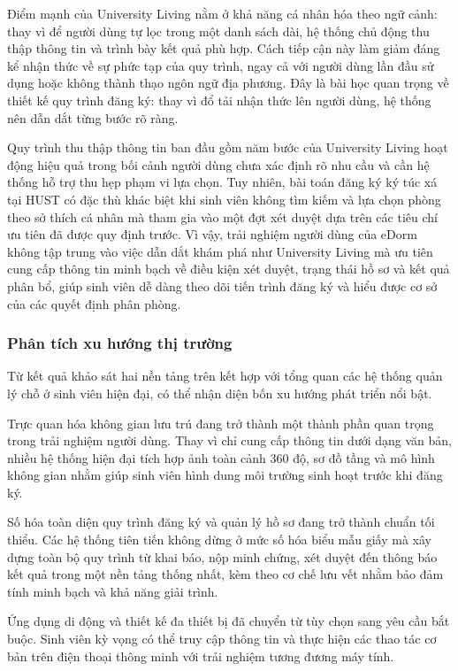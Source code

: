\documentclass[../DoAn.tex]{subfiles}
\begin{document}
Điểm mạnh của University Living nằm ở khả năng cá nhân hóa theo ngữ cảnh: thay
vì để người dùng tự lọc trong một danh sách dài, hệ thống chủ động thu thập
thông tin và trình bày kết quả phù hợp. Cách tiếp cận này làm giảm đáng kể
nhận thức về sự phức tạp của quy trình, ngay cả với người dùng lần đầu sử dụng
hoặc không thành thạo ngôn ngữ địa phương. Đây là bài học quan trọng về thiết
kế quy trình đăng ký: thay vì đổ tải nhận thức lên người dùng, hệ thống nên
dẫn dắt từng bước rõ ràng.

Quy trình thu thập thông tin ban đầu gồm năm bước của University Living hoạt
động hiệu quả trong bối cảnh người dùng chưa xác định rõ nhu cầu và cần hệ
thống hỗ trợ thu hẹp phạm vi lựa chọn. Tuy nhiên, bài toán đăng ký ký túc xá
tại HUST có đặc thù khác biệt khi sinh viên không tìm kiếm và lựa chọn phòng
theo sở thích cá nhân mà tham gia vào một đợt xét duyệt dựa trên các tiêu chí
ưu tiên đã được quy định trước. Vì vậy, trải nghiệm người dùng của eDorm không
tập trung vào việc dẫn dắt khám phá như University Living mà ưu tiên cung cấp
thông tin minh bạch về điều kiện xét duyệt, trạng thái hồ sơ và kết quả phân
bổ, giúp sinh viên dễ dàng theo dõi tiến trình đăng ký và hiểu được cơ sở của
các quyết định phân phòng.

\subsubsection*{Phân tích xu hướng thị trường}

Từ kết quả khảo sát hai nền tảng trên kết hợp với tổng quan các hệ thống quản
lý chỗ ở sinh viên hiện đại, có thể nhận diện bốn xu hướng phát triển nổi bật.

Trực quan hóa không gian lưu trú đang trở thành một thành phần quan trọng trong
trải nghiệm người dùng. Thay vì chỉ cung cấp thông tin dưới dạng văn bản, nhiều
hệ thống hiện đại tích hợp ảnh toàn cảnh 360 độ, sơ đồ tầng và mô hình không
gian nhằm giúp sinh viên hình dung môi trường sinh hoạt trước khi đăng ký.

Số hóa toàn diện quy trình đăng ký và quản lý hồ sơ đang trở thành chuẩn tối
thiểu. Các hệ thống tiên tiến không dừng ở mức số hóa biểu mẫu giấy mà xây dựng
toàn bộ quy trình từ khai báo, nộp minh chứng, xét duyệt đến thông báo kết quả
trong một nền tảng thống nhất, kèm theo cơ chế lưu vết nhằm bảo đảm tính minh
bạch và khả năng giải trình.

Ứng dụng di động và thiết kế đa thiết bị đã chuyển từ tùy chọn sang yêu cầu bắt
buộc. Sinh viên kỳ vọng có thể truy cập thông tin và thực hiện các thao tác cơ
bản trên điện thoại thông minh với trải nghiệm tương đương máy tính.
\end{document}
